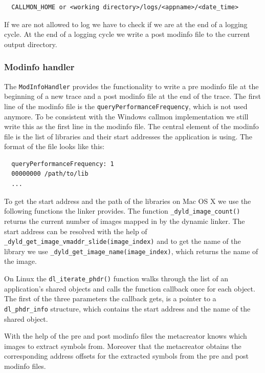 \begin{verbatim}
  CALLMON_HOME or <working directory>/logs/<appname>/<date_time>
\end{verbatim}

If we are not allowed to log we have to check if we are at the end of a logging cycle. At the end of a logging cycle we write a post modinfo file to the current output directory.

\subsubsection{Modinfo handler}

The \verb=ModInfoHandler= provides the functionality to write a pre modinfo file at the beginning of a new trace and a post modinfo file at the end of the trace. The first line of the modinfo file is the \verb=queryPerformanceFrequency=, which is not used anymore. To be consistent with the Windows callmon implementation we still write this as the first line in the modinfo file. The central element of the modinfo file is the list of libraries and their start addresses the application is using. The format of the file looks like this:

\begin{verbatim}
  queryPerformanceFrequency: 1
  00000000 /path/to/lib
  ...
\end{verbatim}

To get the start address and the path of the libraries on Mac OS X we use the following functions the linker provides. The function \verb=_dyld_image_count()= returns the current number of images mapped in by the dynamic linker. The start address can be resolved with the help of \verb=_dyld_get_image_vmaddr_slide(image_index)= and to get the name of the library we use \verb=_dyld_get_image_name(image_index)=, which returns the name of the image.

On Linux the \verb=dl_iterate_phdr()= function walks through the list of an application's shared objects and calls the function callback once for each object. The first of the three parameters the callback gets, is a pointer to a \verb=dl_phdr_info= structure, which contains the start address and the name of the shared object.

With the help of the pre and post modinfo files the metacreator knows which images to extract symbols from. Moreover that the metacreator obtains the corresponding address offsets for the extracted symbols from the pre and post modinfo files.

